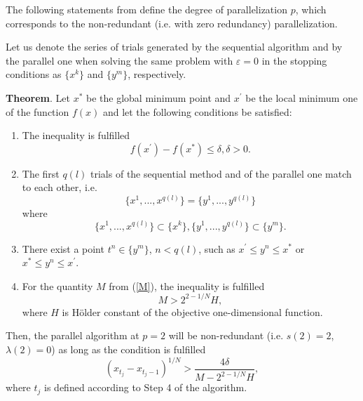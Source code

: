 \documentclass[runningheads]{llncs}
\begin{document}
The following statements from \cite{Strongin2000} define the degree of parallelization $p$, which corresponds to the non-redundant (i.e. with zero redundancy) parallelization.

Let us denote the series of trials generated by the sequential algorithm and by the parallel one when solving the same problem with $\varepsilon=0$ in the stopping conditions as $\{x^k\}$ and $\{y^m\}$, respectively.

\textbf{Theorem}. Let $x^*$ be the global minimum point and $x^{\prime}$ be the local minimum one of the function $f(x)$ and let the following conditions be satisfied:
    \begin{enumerate}
        \item The inequality is fulfilled
            \begin{equation} \label{first_s_ref}
                f(x^{\prime}) - f(x^*) \leq \delta, \delta > 0.
            \end{equation}
        \item The first $q(l)$ trials of the sequential method and of the parallel one match to each other, i.e.
            \begin{equation} \label{second_s_ref}
                \{x^1,...,x^{q(l)}\} = \{y^1,...,y^{q(l)}\}
            \end{equation}
        where
            \begin{equation} \label{third_s_ref}
                \{x^1,...,x^{q(l)}\} \subset \{x^k\}, \{y^1,...,y^{q(l)}\}\subset \{y^m\}.
            \end{equation}
        \item There exist a point $t^n \in \{y^m\}$, $n < q(l)$, such as $x^{\prime} \leq y^n \leq x^*$ or $x^* \leq y^n \leq x^{\prime}$.
        \item For the quantity $M$ from (\ref{M}), the inequality is fulfilled 
            \begin{equation} \label{fourth_s_ref}
                M > 2^{2 - 1/N} H,
            \end{equation}
        where $H$ is H{\"o}lder constant of the objective one-dimensional function.
    \end{enumerate}

Then, the parallel algorithm at $p=2$ will be non-redundant (i.e. $s(2)=2$, $\lambda(2)=0$) as long as the condition is fulfilled 
\begin{equation} \label{p_two_ref}
    (x_{t_j} - x_{t_j - 1})^{1/N} > \frac{4\delta}{M - 2^{2 - 1/N} H},
\end{equation}
where $t_j$ is defined according to Step 4 of the algorithm.
\end{document}
